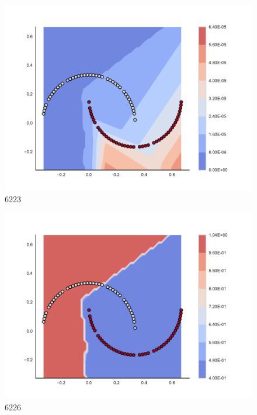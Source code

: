 \begin{subfigure}[b]{0.09\textwidth}
    \includegraphics[clip, trim=2.35cm 1.75cm 4.5cm 0cm,width=\textwidth]{img/convergence/6223.pdf}
    \caption{6223}
    \label{fig:convergence_6223}
\end{subfigure}
%
\begin{subfigure}[b]{0.09\textwidth}
    \includegraphics[clip, trim=2.35cm 1.75cm 4.5cm 0cm,width=\textwidth]{img/convergence/6226.pdf}
    \caption{6226}
    \label{fig:convergence_6226}
\end{subfigure}
%
